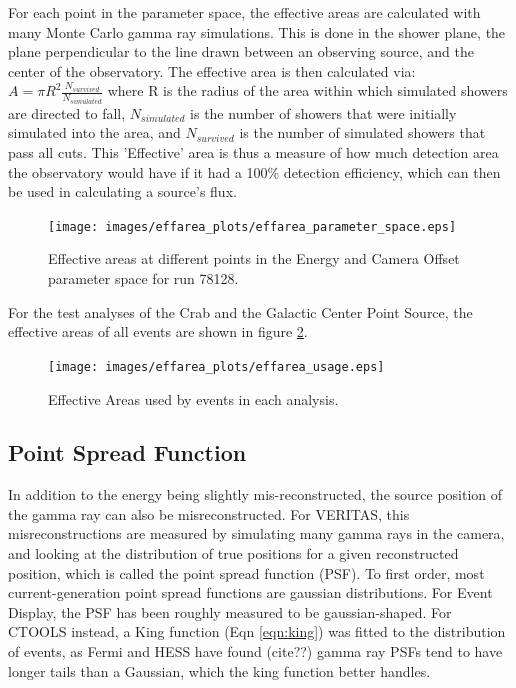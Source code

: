 For each point in the parameter space, the effective areas are calculated with many Monte Carlo gamma ray simulations.
This is done in the shower plane, the plane perpendicular to the line drawn between an observing source, and the center of the observatory.
The effective area is then calculated via:
$A=\pi R^2 \frac{N_{survived}}{N_{simulated}}$
where R is the radius of the area within which simulated showers are directed to fall, $N_{simulated}$ is the number of showers that were initially simulated into the area, and $N_{survived}$ is the number of simulated showers that pass all cuts.
This 'Effective' area is thus a measure of how much detection area the observatory would have if it had a 100\% detection efficiency, which can then be used in calculating a source's flux.

\begin{figure}[ht]
  \begin{center}
    \texttt{[image: images/effarea\_plots/effarea\_parameter\_space.eps]}
    \caption[Effective Area Parameter Space]{Effective areas at different points in the Energy and Camera Offset parameter space for run 78128.}\label{fig:effarea_paramspace}
  \end{center}
\end{figure}

For the test analyses of the Crab and the Galactic Center Point Source, the effective areas of all events are shown in figure \ref{fig:effarea_usage}.

\begin{figure}[ht]
  \begin{center}
    \texttt{[image: images/effarea\_plots/effarea\_usage.eps]}
    \caption[Effective Area Parameter Space]{Effective Areas used by events in each analysis.}\label{fig:effarea_usage}
  \end{center}
\end{figure}

\subsection{Point Spread Function}\label{sec:psf}

In addition to the energy being slightly mis-reconstructed, the source position of the gamma ray can also be misreconstructed.
For VERITAS, this misreconstructions are measured by simulating many gamma rays in the camera, and looking at the distribution of true positions for a given reconstructed position, which is called the point spread function (PSF).
To first order, most current-generation point spread functions are gaussian distributions.
For Event Display, the PSF has been roughly measured to be gaussian-shaped.
For CTOOLS instead, a King function (Eqn \ref{eqn:king}) was fitted to the distribution of events, as Fermi and HESS have found (cite??) gamma ray PSFs tend to have longer tails than a Gaussian, which the king function better handles.

